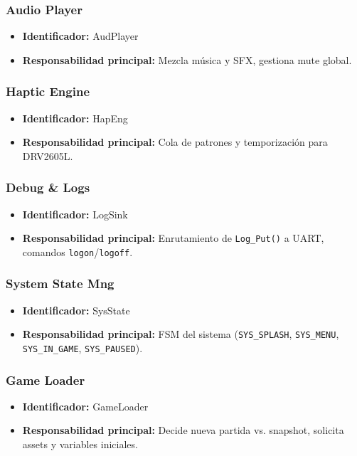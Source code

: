 \documentclass[11pt,a4paper]{article}
\begin{document}
\subsubsection{Audio Player}
\begin{itemize}
  \item \textbf{Identificador:} AudPlayer
  \item \textbf{Responsabilidad principal:} Mezcla música y SFX, gestiona mute global.
\end{itemize}

\subsubsection{Haptic Engine}
\begin{itemize}
  \item \textbf{Identificador:} HapEng
  \item \textbf{Responsabilidad principal:} Cola de patrones y temporización para DRV2605L.
\end{itemize}

\subsubsection{Debug \& Logs}
\begin{itemize}
  \item \textbf{Identificador:} LogSink
  \item \textbf{Responsabilidad principal:} Enrutamiento de \texttt{Log\_Put()} a UART, comandos \texttt{logon}/\texttt{logoff}.
\end{itemize}

\subsubsection{System State Mng}
\begin{itemize}
  \item \textbf{Identificador:} SysState
  \item \textbf{Responsabilidad principal:} FSM del sistema (\texttt{SYS\_SPLASH}, \texttt{SYS\_MENU}, \texttt{SYS\_IN\_GAME}, \texttt{SYS\_PAUSED}).
\end{itemize}

\subsubsection{Game Loader}
\begin{itemize}
  \item \textbf{Identificador:} GameLoader
  \item \textbf{Responsabilidad principal:} Decide nueva partida vs. snapshot, solicita assets y variables iniciales.
\end{itemize}
\end{document}
